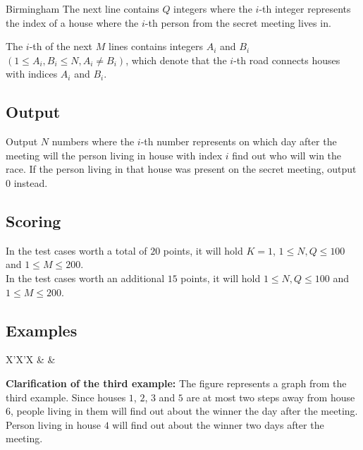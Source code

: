 \begin{statement}[
  problempoints=70,
  timelimit=1 second,
  memorylimit=512 MiB,
]{Birmingham}
The next line contains $Q$ integers where the $i$-th integer represents
the index of a house where the $i$-th person from the secret meeting lives in.

The $i$-th of the next $M$ lines contains integers $A_i$ and $B_i$ $(1
\le A_i, B_i \le N, A_i \neq B_i)$, which denote that the $i$-th road
connects houses with indices $A_i$ and $B_i$.

\subsection*{Output}
Output $N$ numbers where the $i$-th number represents on which day after the
meeting will the person living in house with index $i$ find out who will win
the race.  If the person living in that house was present on the secret
meeting, output $0$ instead.

\subsection*{Scoring}
In the test cases worth a total of $20$ points, it will hold $K=1$, $1 \le N, Q
\le 100$ and $1 \le M \le 200$.\\
In the test cases worth an additional $15$ points, it will hold $1 \le N, Q \le
100$ and $1 \le M \le 200$.

\subsection*{Examples}
\begin{tabularx}{\textwidth}{X'X'X}
 &
 &
\end{tabularx}

\textbf{Clarification of the third example:}
The figure represents a graph from the third example. Since houses $1$, $2$, $3$
and $5$ are at most two steps away from house $6$, people living in them will
find out about the winner the day after the meeting. Person living in house $4$
will find out about the winner two days after the meeting.


\end{statement}
